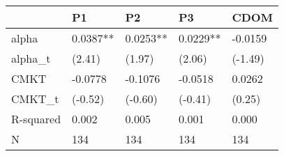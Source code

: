 \begin{tabular}{lllll}
\toprule
 & P1 & P2 & P3 & CDOM \\
\midrule
alpha & 0.0387** & 0.0253** & 0.0229** & -0.0159 \\
alpha_t & (2.41) & (1.97) & (2.06) & (-1.49) \\
CMKT & -0.0778 & -0.1076 & -0.0518 & 0.0262 \\
CMKT_t & (-0.52) & (-0.60) & (-0.41) & (0.25) \\
R-squared & 0.002 & 0.005 & 0.001 & 0.000 \\
N & 134 & 134 & 134 & 134 \\
\bottomrule
\end{tabular}
